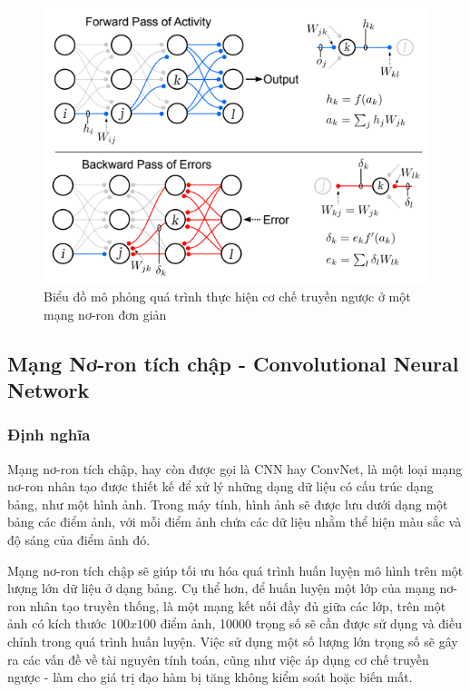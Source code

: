 \begin{figure}[H]
    \centering
    \includegraphics{pics/Chapter3/backprop.png}
    \caption{Biểu đồ mô phỏng quá trình thực hiện cơ chế truyền ngược ở một mạng nơ-ron đơn giản \cite{lillicrap2020backpropagation}}
    \label{fig:enter-label}
\end{figure}

\subsection{Mạng Nơ-ron tích chập - Convolutional Neural Network}
\subsubsection*{Định nghĩa}
Mạng nơ-ron tích chập, hay còn được gọi là CNN hay ConvNet, là một loại mạng nơ-ron nhân tạo được thiết kế để xử lý những dạng dữ liệu có cấu trúc dạng bảng, như một hình ảnh. Trong máy tính, hình ảnh sẽ được lưu dưới dạng một bảng các điểm ảnh, với mỗi điểm ảnh chứa các dữ liệu nhằm thể hiện màu sắc và độ sáng của điểm ảnh đó.


Mạng nơ-ron tích chập sẽ giúp tối ưu hóa quá trình huấn luyện mô hình trên một lượng lớn dữ liệu ở dạng bảng. Cụ thể hơn, để huấn luyện một lớp của mạng nơ-ron nhân tạo truyền thống, là một mạng kết nối đầy đủ giữa các lớp, trên một ảnh có kích thước $100x100$ điểm ảnh, 10000 trọng số sẽ cần được sử dụng và điều chỉnh trong quá trình huấn luyện. Việc sử dụng một số lượng lớn trọng số sẽ gây ra các vấn đề về tài nguyên tính toán, cũng như việc áp dụng cơ chế truyền ngược - làm cho giá trị đạo hàm bị tăng không kiểm soát hoặc biến mất.

